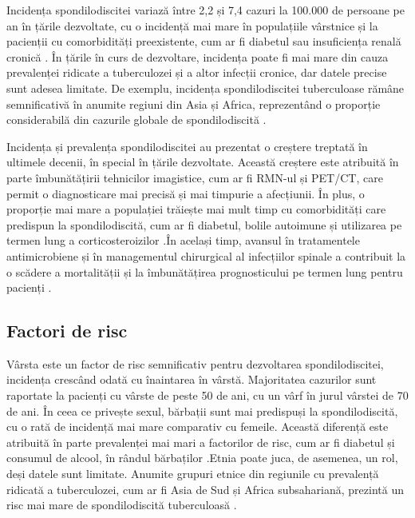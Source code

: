 \message{ !name(LaMain.tex)}\documentclass[romanian,12pt,a4paper]{article}
\begin{document}
Incidența spondilodiscitei variază între 2,2 și 7,4 cazuri la 100.000 de
persoane pe an în țările dezvoltate, cu o incidență mai mare în
populațiile vârstnice și la pacienții cu comorbidități preexistente, cum
ar fi diabetul sau insuficiența renală cronică
\cite{ImagingAssessmentSpine2024}. În țările în curs de dezvoltare,
incidența poate fi mai mare din cauza prevalenței ridicate a
tuberculozei și a altor infecții cronice, dar datele precise sunt adesea
limitate. De exemplu, incidența spondilodiscitei tuberculoase rămâne
semnificativă în anumite regiuni din Asia și Africa, reprezentând o
proporție considerabilă din cazurile globale de spondilodiscită
\cite{RadionuclideImagingMusculoskeletal2016}.

Incidența și prevalența spondilodiscitei au prezentat o creștere
treptată în ultimele decenii, în special în țările dezvoltate. Această
creștere este atribuită în parte îmbunătățirii tehnicilor imagistice,
cum ar fi RMN-ul și PET/CT, care permit o diagnosticare mai precisă și
mai timpurie a afecțiunii. În plus, o proporție mai mare a populației
trăiește mai mult timp cu comorbidități care predispun la
spondilodiscită, cum ar fi diabetul, bolile autoimune și utilizarea pe
termen lung a corticosteroizilor
\cite{RoleNuclearMedicine2012}\cite{ImagingAssessmentSpine2024}.În
același timp, avansul în tratamentele antimicrobiene și în managementul
chirurgical al infecțiilor spinale a contribuit la o scădere a
mortalității și la îmbunătățirea prognosticului pe termen lung pentru
pacienți \cite{RadionuclideImagingMusculoskeletal2016}.

\subsection{Factori de risc}

Vârsta este un factor de risc semnificativ pentru dezvoltarea
spondilodiscitei, incidența crescând odată cu înaintarea în vârstă.
Majoritatea cazurilor sunt raportate la pacienți cu vârste de peste 50
de ani, cu un vârf în jurul vârstei de 70 de ani. În ceea ce privește
sexul, bărbații sunt mai predispuși la spondilodiscită, cu o rată de
incidență mai mare comparativ cu femeile. Această diferență este
atribuită în parte prevalenței mai mari a factorilor de risc, cum ar fi
diabetul și consumul de alcool, în rândul bărbaților
\cite{RoleNuclearMedicine2012}.Etnia poate juca, de asemenea, un rol,
deși datele sunt limitate. Anumite grupuri etnice din regiunile cu
prevalență ridicată a tuberculozei, cum ar fi Asia de Sud și Africa
subsahariană, prezintă un risc mai mare de spondilodiscită tuberculoasă
\cite{ImagingAssessmentSpine2024}.
\end{document}
